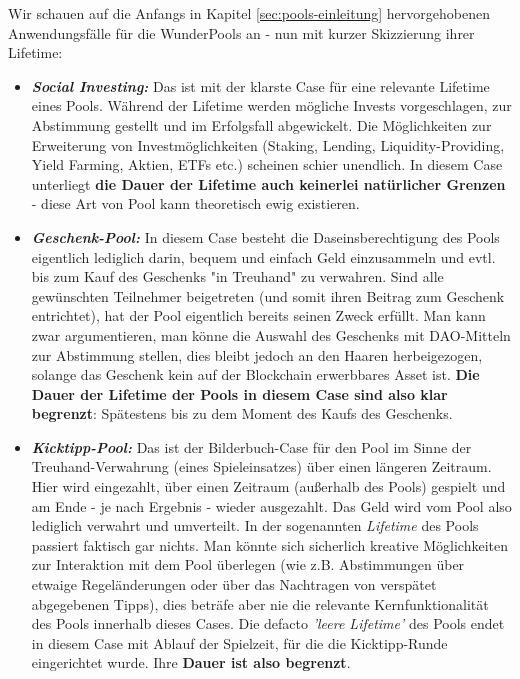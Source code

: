 \vspace{0.1cm}

Wir schauen auf die Anfangs in Kapitel \ref{sec:pools-einleitung} hervorgehobenen Anwendungsfälle für die WunderPools an - nun mit kurzer Skizzierung ihrer Lifetime:

\begin{itemize}
  \item \textbf{\textit{Social Investing:}} Das ist mit der klarste Case für eine relevante Lifetime eines Pools. Während der Lifetime werden mögliche Invests vorgeschlagen, zur Abstimmung gestellt und im Erfolgsfall abgewickelt. Die Möglichkeiten zur Erweiterung von Investmöglichkeiten (Staking, Lending, Liquidity-Providing, Yield Farming, Aktien, ETFs etc.) scheinen schier unendlich. In diesem Case unterliegt \textbf{die Dauer der Lifetime auch keinerlei natürlicher Grenzen} - diese Art von Pool kann theoretisch ewig existieren.
  \item \textbf{\textit{Geschenk-Pool:}} In diesem Case besteht die Daseinsberechtigung des Pools eigentlich lediglich darin, bequem und einfach Geld einzusammeln und evtl. bis zum Kauf des Geschenks "in Treuhand" zu verwahren. Sind alle gewünschten Teilnehmer beigetreten (und somit ihren Beitrag zum Geschenk entrichtet), hat der Pool eigentlich bereits seinen Zweck erfüllt. Man kann zwar argumentieren, man könne die Auswahl des Geschenks mit DAO-Mitteln zur Abstimmung stellen, dies bleibt jedoch an den Haaren herbeigezogen, solange das Geschenk kein auf der Blockchain erwerbbares Asset ist. \textbf{Die Dauer der Lifetime der Pools in diesem Case sind also klar begrenzt}: Spätestens bis zu dem Moment des Kaufs des Geschenks.
  \item \textbf{\textit{Kicktipp-Pool:}} Das ist der Bilderbuch-Case für den Pool im Sinne der Treuhand-Verwahrung (eines Spieleinsatzes) über einen längeren Zeitraum. Hier wird eingezahlt, über einen Zeitraum (außerhalb des Pools) gespielt und am Ende - je nach Ergebnis - wieder ausgezahlt. Das Geld wird vom Pool also lediglich verwahrt und umverteilt. In der sogenannten \textit{Lifetime} des Pools passiert faktisch gar nichts. Man könnte sich sicherlich kreative Möglichkeiten zur Interaktion mit dem Pool überlegen (wie z.B. Abstimmungen über etwaige Regeländerungen oder über das Nachtragen von verspätet abgegebenen Tipps), dies beträfe aber nie die relevante Kernfunktionalität des Pools innerhalb dieses Cases. Die defacto \textit{'leere Lifetime'} des Pools endet in diesem Case mit Ablauf der Spielzeit, für die die Kicktipp-Runde eingerichtet wurde. Ihre \textbf{Dauer ist also begrenzt}.

\end{itemize}
